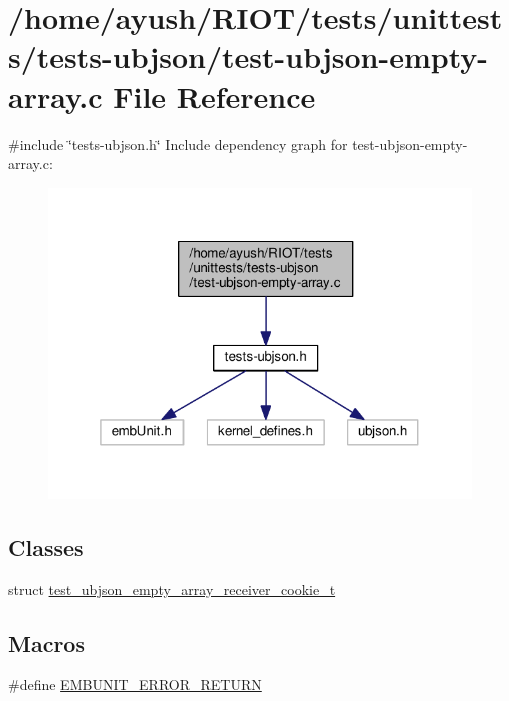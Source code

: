 \hypertarget{test-ubjson-empty-array_8c}{}\section{/home/ayush/\+R\+I\+O\+T/tests/unittests/tests-\/ubjson/test-\/ubjson-\/empty-\/array.c File Reference}
\label{test-ubjson-empty-array_8c}
{\ttfamily \#include \char`\"{}tests-\/ubjson.\+h\char`\"{}}\newline
Include dependency graph for test-\/ubjson-\/empty-\/array.c\+:
\nopagebreak
\begin{figure}[H]
\begin{center}
\leavevmode
\includegraphics[width=319pt]{test-ubjson-empty-array_8c__incl}
\end{center}
\end{figure}
\subsection*{Classes}
\begin{DoxyCompactItemize}
\item 
struct \hyperlink{structtest__ubjson__empty__array__receiver__cookie__t}{test\+\_\+ubjson\+\_\+empty\+\_\+array\+\_\+receiver\+\_\+cookie\+\_\+t}
\end{DoxyCompactItemize}
\subsection*{Macros}
\begin{DoxyCompactItemize}
\item 
\#define \hyperlink{test-ubjson-empty-array_8c_a3a0f560c4fe9cc5130773a84ff587b9e}{E\+M\+B\+U\+N\+I\+T\+\_\+\+E\+R\+R\+O\+R\+\_\+\+R\+E\+T\+U\+RN}
\end{DoxyCompactItemize}
